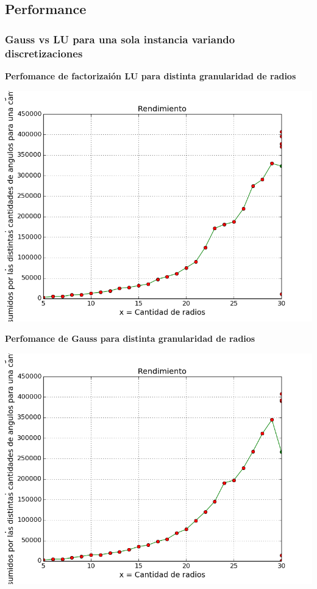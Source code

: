 \subsection{Performance}
\subsubsection{Gauss vs LU para una sola instancia variando discretizaciones}

  	\textbf{Perfomance de factorizai\'on LU para distinta granularidad de radios}\\

\begin{center}
\includegraphics[scale=0.65]{experimentos2a_2b/gaussMed.png}
\end{center}

  	\textbf{Perfomance de Gauss para distinta granularidad de radios}\\

\begin{center}
\includegraphics[scale=0.65]{experimentos2a_2b/Lumed.png}
\end{center}

